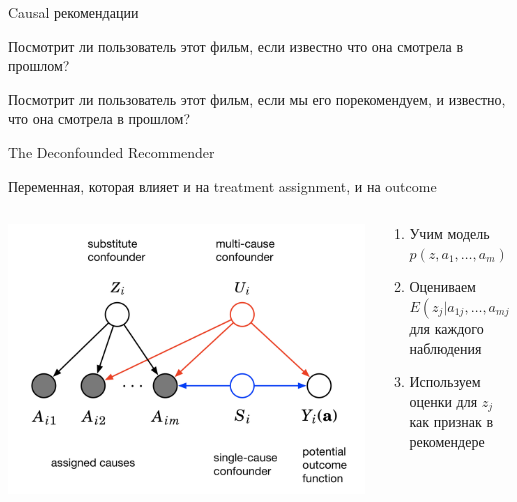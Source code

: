 \documentclass[11pt,aspectratio=169,handout]{beamer}
\begin{document}
\begin{frame}{Causal рекомендации}

\begin{tcolorbox}[colback=warn!5,colframe=warn!80,title=Традиционный рекомендер]
Посмотрит ли пользователь этот фильм, если известно что она смотрела в прошлом?
\end{tcolorbox}

\begin{tcolorbox}[colback=info!5,colframe=info!80,title=Causal рекомендер]
Посмотрит ли пользователь этот фильм, если мы его порекомендуем, и известно, что она смотрела в прошлом?
\end{tcolorbox}

\end{frame}

\begin{frame}{The Deconfounded Recommender \cite{DECONF}}

\vfill

\begin{tcolorbox}[colback=gray!5,colframe=gray!80,title=Confounder]
Переменная, которая влияет и на treatment assignment, и на outcome
\end{tcolorbox}

\begin{columns}
\begin{column}{0.4\textwidth}
\begin{center}
\includegraphics[scale=0.2]{images/blessings.png}
\end{center}
\end{column}

\begin{column}{0.5\textwidth}
\begin{enumerate}
\item Учим модель $p(z, a_1, \ldots, a_m)$
\item Оцениваем $E(z_j | a_{1j}, \ldots, a_{mj})$ для каждого наблюдения
\item Используем оценки для $z_j$ как признак в рекомендере
\end{enumerate}
\end{column}
\end{columns}

\end{frame}
\end{document}

